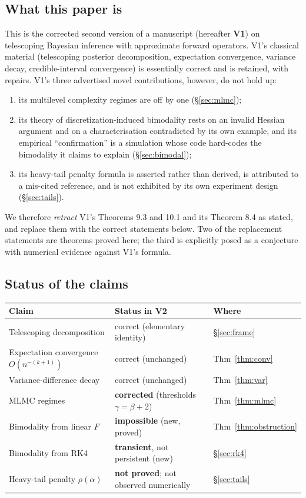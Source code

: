 \documentclass[11pt]{article}
\theoremstyle{definition}
\theoremstyle{remark}
\begin{document}
\subsection{What this paper is}
This is the corrected second version of a manuscript (hereafter \textbf{V1}) on telescoping
Bayesian inference with approximate forward operators. V1's classical material (telescoping
posterior decomposition, expectation convergence, variance decay, credible-interval convergence) is
essentially correct and is retained, with repairs. V1's three advertised novel contributions,
however, do not hold up:
\begin{enumerate}
\item its multilevel complexity regimes are off by one (\S\ref{sec:mlmc});
\item its theory of discretization-induced bimodality rests on an invalid Hessian argument and on a
      characterisation contradicted by its own example, and its empirical ``confirmation'' is a
      simulation whose code hard-codes the bimodality it claims to explain (\S\ref{sec:bimodal});
\item its heavy-tail penalty formula is asserted rather than derived, is attributed to a
      mis-cited reference, and is not exhibited by its own experiment design (\S\ref{sec:tails}).
\end{enumerate}
We therefore \emph{retract} V1's Theorems 9.3 and 10.1 and its Theorem 8.4 as stated, and replace
them with the correct statements below. Two of the replacement statements are theorems proved here;
the third is explicitly posed as a conjecture with numerical evidence against V1's formula.

\subsection{Status of the claims}
\begin{center}
\begin{tabular}{lll}
\toprule
Claim & Status in V2 & Where \\
\midrule
Telescoping decomposition & correct (elementary identity) & \S\ref{sec:frame} \\
Expectation convergence $O(n^{-(k+1)})$ & correct (unchanged) & Thm~\ref{thm:conv} \\
Variance-difference decay & correct (unchanged) & Thm~\ref{thm:var} \\
MLMC regimes & \textbf{corrected} (thresholds $\gamma=\beta+2$) & Thm~\ref{thm:mlmc} \\
Bimodality from linear $F$ & \textbf{impossible} (new, proved) & Thm~\ref{thm:obstruction} \\
Bimodality from RK4 & \textbf{transient}, not persistent (new) & \S\ref{sec:rk4} \\
Heavy-tail penalty $\rho(\alpha)$ & \textbf{not proved}; not observed numerically & \S\ref{sec:tails} \\
\bottomrule
\end{tabular}
\end{center}
\end{document}

